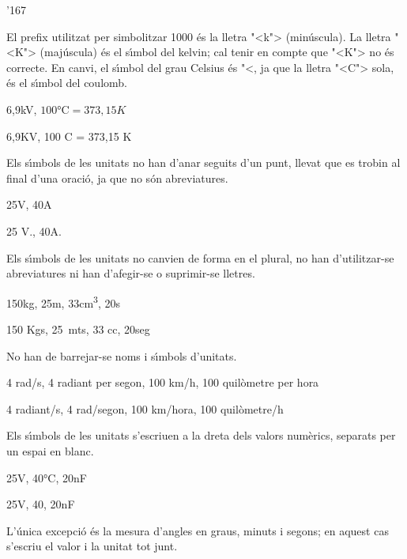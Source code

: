 \begin{dinglist}{'167}

\item El prefix utilitzat per simbolitzar 1000 \'{e}s la lletra {"<}k{">} (min\'{u}scula).  La lletra {"<}K{">} (maj\'{u}scula) \'{e}s el s\'{\i}mbol del  kelvin; cal tenir en compte que {"<}\degree K{">}  no \'{e}s correcte. En canvi, el s\'{\i}mbol del grau Celsius \'{e}s {"<}, ja que la lletra {"<}C{">} sola, \'{e}s el s\'{\i}mbol del coulomb.

\textcolor{Green}{} 6,9\unit{kV}, $100\unit{\celsius} = 373{,}15\unit{K}$

\textcolor{Red}{} 6,9\unit{KV}, 100 C = 373{,}15 \degree K

\item Els s\'{\i}mbols de les unitats no han d'anar seguits d'un punt, llevat que es trobin al final d'una oraci\'{o}, ja que no s\'{o}n
abreviatures.

\textcolor{Green}{} 25\unit{V}, 40\unit{A}

\textcolor{Red}{} 25 V.,  40\unit{A}.


\item Els s\'{\i}mbols de les unitats no canvien de forma en el plural, no han
d'utilitzar-se abreviatures ni han d'afegir-se o suprimir-se
lletres.

\textcolor{Green}{} 150\unit{kg}, 25\unit{m},  33\unit{cm^3}, 20\unit{s}

\textcolor{Red}{} 150 Kgs, 25~mts, 33 cc, 20\unit{seg}

\item No han de barrejar-se noms i s\'{\i}mbols d'unitats.

\textcolor{Green}{} 4 rad/s, 4 radiant per segon, 100 km/h, 100 quil\`{o}metre per hora

\textcolor{Red}{} 4 radiant/s, 4 rad/segon, 100 km/hora, 100 quil\`{o}metre/h

\item Els s\'{\i}mbols de les unitats s'escriuen a la dreta dels valors
num\`{e}rics, separats per un espai en blanc.

\textcolor{Green}{} 25\unit{V}, 40\unit{\celsius}, 20\unit{nF}

\textcolor{Red}{} 25V, 40\celsius, 20nF

 L'\'{u}nica excepci\'{o} \'{e}s la mesura d'angles en graus, minuts i segons; en aquest cas s'escriu el valor i la unitat tot junt.


\end{dinglist}
